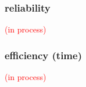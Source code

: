 \begin{comment}
correlate latent scores (from different methods) with entropy measures (see research proposal)

\textbf{critique:} What about decision statements or think at loud rating process? (is it possible), \citet{Lesterhuis_2018} has shown their usefulness, while \citet{Boonen_et_al_2020} signals the need to know about the inner working of judgment processes.
\end{comment}
%
%
\subsubsection{reliability}
%
\textcolor{red}{(in process)}

\begin{comment}
compare the Scale Separation Reliability (SSR, an inter-rater reliability measure), coming from CJ methods, with others for other methods

- No intra-rater reliability, also known as test-retest reliability (Verhavert_2018, Reliability_wiki_2022) 
- No Inter-method reliability,  assesses the degree to which test scores are consistent when there is a variation in the methods or instruments used (Verhavert_2018, Reliability_wiki_2022) 
- No comparison of SSR vs the true correlation of the latent scale and entropy measures 
* Justification: (Verhavert_2018, p. 156) " simulation studies could resolve the inconclusiveness regarding the SSR as a correlation with the truth."
\end{comment}
%
%
\subsubsection{efficiency (time)}
%
\textcolor{red}{(in process)}

\begin{comment}
time needed for each judgement based on method from (Coertjens_et_al_2017).

statistical efficiency has been researched on \citet{Leijon_et_al_2019} and \citet{Pritikin_2020} for the bayesian dichotomous BTL model and the ordinal BTL model, respectively.
\end{comment}
%
%